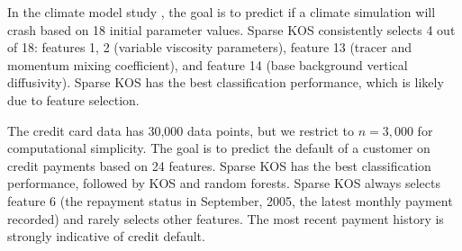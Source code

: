 \documentclass[twoside, onecolumn]{article}
\begin{document}



In the climate model study \cite{lucas2013failure}, the goal is to predict if a climate simulation will crash based on 18 initial parameter values. Sparse KOS consistently selects 4 out of 18: features 1, 2 (variable viscosity parameters), feature 13 (tracer and momentum mixing coefficient), and  feature 14 (base background vertical diffusivity). Sparse KOS has the best classification performance, which is likely due to feature selection.

The credit card data \cite{yeh2009comparisons} has 30,000 data points, but we restrict to $n=3,000$ for computational simplicity. The goal is to predict the default of a customer on credit payments based on 24 features. Sparse KOS has the best classification performance, followed by KOS and random forests. Sparse KOS always selects feature 6 (the repayment status in September, 2005, the latest monthly payment recorded) and rarely selects other features. %
The most recent payment history is strongly indicative of credit default.





\end{document}
